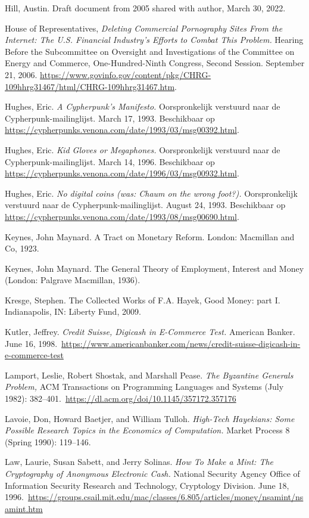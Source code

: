 \documentclass[
  a5paper,
  smalldemyvopaper,11pt,twoside,onecolumn,openright,extrafontsizes,
hidelinks]{memoir}
\begin{document}
{Hill, Austin. Draft document from 2005 shared with author, March 30,
2022.

House of Representatives, \emph{Deleting Commercial Pornography Sites
From the Internet: The U.S. Financial Industry's Efforts to Combat This
Problem.} Hearing Before the Subcommittee on Oversight and
Investigations of the Committee on Energy and Commerce,
One-Hundred-Ninth Congress, Second Session. September 21, 2006.
\url{https://www.govinfo.gov/content/pkg/CHRG-109hhrg31467/html/CHRG-109hhrg31467.htm}.

Hughes, Eric. \emph{A Cypherpunk's Manifesto.} Oorspronkelijk verstuurd
naar de Cypherpunk-mailinglijst. March 17, 1993. Beschikbaar op
\url{https://cypherpunks.venona.com/date/1993/03/msg00392.html}.

Hughes, Eric. \emph{Kid Gloves or Megaphones.} Oorspronkelijk verstuurd
naar de Cypherpunk-mailinglijst. March 14, 1996. Beschikbaar op
\url{https://cypherpunks.venona.com/date/1996/03/msg00932.html}.

Hughes, Eric. \emph{No digital coins (was: Chaum on the wrong foot?).}
Oorspronkelijk verstuurd naar de Cypherpunk-mailinglijst. August 24,
1993. Beschikbaar op
\url{https://cypherpunks.venona.com/date/1993/08/msg00690.html}.

Keynes, John Maynard. A Tract on Monetary Reform. London: Macmillan and
Co, 1923.

Keynes, John Maynard. The General Theory of Employment, Interest and
Money (London: Palgrave Macmillan, 1936).

Kresge, Stephen. The Collected Works of F.A. Hayek, Good Money: part I.
Indianapolis, IN: Liberty Fund, 2009.

Kutler, Jeffrey. \emph{Credit Suisse, Digicash in E-Commerce Test.}
American Banker. June 16,
1998.~\url{https://www.americanbanker.com/news/credit-suisse-digicash-in-e-commerce-test}

Lamport, Leslie, Robert Shostak, and Marshall Pease. \emph{The Byzantine
Generals Problem,} ACM Transactions on Programming Languages and Systems
(July 1982):
382--401.~\url{https://dl.acm.org/doi/10.1145/357172.357176}

Lavoie, Don, Howard Baetjer, and William Tulloh. \emph{High-Tech
Hayekians: Some Possible Research Topics in the Economics of
Computation.} Market Process 8 (Spring 1990): 119--146.

Law, Laurie, Susan Sabett, and Jerry Solinas. \emph{How To Make a Mint:
The Cryptography of Anonymous Electronic Cash.} National Security Agency
Office of Information Security Research and Technology, Cryptology
Division. June 18,
1996.~\url{https://groups.csail.mit.edu/mac/classes/6.805/articles/money/nsamint/nsamint.htm}

}
\end{document}
